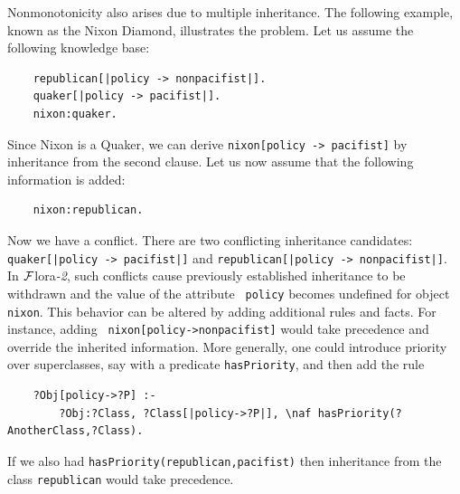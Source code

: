 \documentclass[11pt]{article}
\newcommand{\FLSYSTEM}{{\mbox{\sc ${\cal F}${lora}\rm\emph{-2}}}\xspace}
\begin{document}
Nonmonotonicity also arises due to multiple inheritance. The following
example, known as the Nixon Diamond, illustrates the problem. Let us assume
the following knowledge base:
\begin{verbatim}
    republican[|policy -> nonpacifist|].
    quaker[|policy -> pacifist|].
    nixon:quaker.
\end{verbatim}
Since Nixon is a Quaker, we can derive {\tt nixon[policy -> pacifist]}
by inheritance from the second clause. Let us now assume that the following
information is added:
\begin{verbatim}
    nixon:republican.  
\end{verbatim}
Now we have a conflict. There are two conflicting inheritance candidates:
{\tt quaker[|policy -> pacifist|]} and {\tt republican[|policy ->
  nonpacifist|]}.  In \FLSYSTEM, such conflicts cause previously
established inheritance to be withdrawn and the value of the attribute {\tt
  policy} becomes undefined for object {\tt nixon}.  This behavior can be
altered by adding additional rules and facts. For instance, adding {\tt
  nixon[policy->nonpacifist]} would take precedence and override the
inherited information. More generally, one could introduce priority over
superclasses, say with a predicate {\tt hasPriority}, and then add the rule
\begin{verbatim}
    ?Obj[policy->?P] :-
        ?Obj:?Class, ?Class[|policy->?P|], \naf hasPriority(?AnotherClass,?Class).
\end{verbatim}
If we also had {\tt hasPriority(republican,pacifist)} then inheritance from
the class {\tt republican} would take precedence. 
\end{document}
